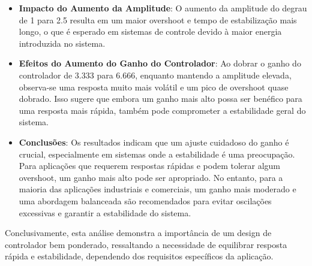\begin{itemize}
    \item \textbf{Impacto do Aumento da Amplitude}: O aumento da amplitude do degrau de 1 para 2.5 resulta em um maior overshoot e tempo de estabilização mais longo, o que é esperado em sistemas de controle devido à maior energia introduzida no sistema.

    \item \textbf{Efeitos do Aumento do Ganho do Controlador}: Ao dobrar o ganho do controlador de 3.333 para 6.666, enquanto mantendo a amplitude elevada, observa-se uma resposta muito mais volátil e um pico de overshoot quase dobrado. Isso sugere que embora um ganho mais alto possa ser benéfico para uma resposta mais rápida, também pode comprometer a estabilidade geral do sistema.

    \item \textbf{Conclusões}: Os resultados indicam que um ajuste cuidadoso do ganho é crucial, especialmente em sistemas onde a estabilidade é uma preocupação. Para aplicações que requerem respostas rápidas e podem tolerar algum overshoot, um ganho mais alto pode ser apropriado. No entanto, para a maioria das aplicações industriais e comerciais, um ganho mais moderado e uma abordagem balanceada são recomendados para evitar oscilações excessivas e garantir a estabilidade do sistema.
\end{itemize}

Conclusivamente, esta análise demonstra a importância de um design de controlador bem ponderado, ressaltando a necessidade de equilibrar resposta rápida e estabilidade, dependendo dos requisitos específicos da aplicação.

